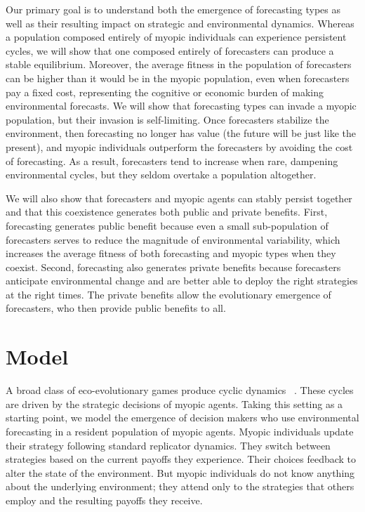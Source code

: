 \documentclass{article}
\begin{document}
Our primary goal is to understand both the emergence of forecasting types as well as their resulting impact on strategic and environmental dynamics. Whereas a population composed entirely of myopic individuals can experience persistent cycles, we will show that one composed entirely of forecasters can produce a stable equilibrium. Moreover, the average fitness in the population of forecasters can be higher than it would be in the myopic population, even when forecasters pay a fixed cost, representing the cognitive or economic burden of making environmental forecasts. We will show that forecasting types can invade a myopic population, but their invasion is self-limiting. Once forecasters stabilize the environment, then forecasting no longer has value (the future will be just like the present), and myopic individuals outperform the forecasters by avoiding the cost of forecasting. As a result, forecasters tend to increase when rare, dampening environmental cycles, but they seldom overtake a population altogether.

We will also show that forecasters and myopic agents can stably persist together and that this coexistence generates both public and private benefits. First, forecasting generates public benefit because even a small sub-population of forecasters serves to reduce the magnitude of environmental variability, which increases the average fitness of both forecasting and myopic types when they coexist. Second, forecasting also generates private benefits because forecasters anticipate environmental change and are better able to deploy the right strategies at the right times. The private benefits allow the evolutionary emergence of forecasters, who then provide public benefits to all.


\section*{Model}
A broad class of eco-evolutionary games produce cyclic dynamics ~\citep{weitz,tilman2020}. These cycles are driven by the strategic decisions of myopic agents. Taking this setting as a starting point, we model the emergence of decision makers who use environmental forecasting in a resident population of myopic agents. Myopic individuals update their strategy following standard replicator dynamics. They switch between strategies based on the current payoffs they experience. Their choices feedback to alter the state of the environment. But myopic individuals do not know anything about the underlying environment; they attend only to the strategies that others employ and the resulting payoffs they receive. 
\end{document}
